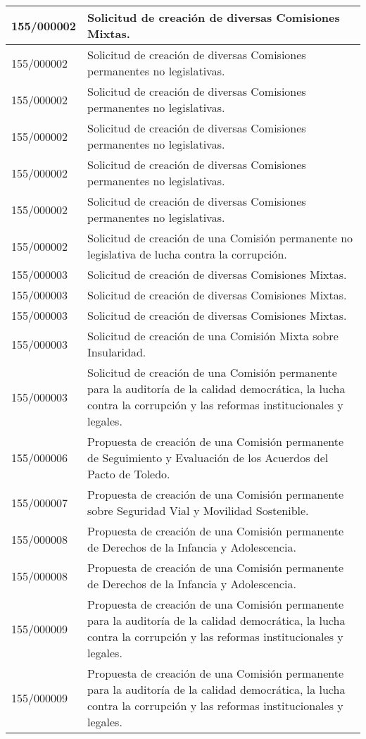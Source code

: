 {\begin{table}[H]
\begin{center}
\begin{tabularx}{\linewidth}{| l | X |}
\hline
155/000002 & Solicitud de creación de diversas Comisiones Mixtas. \\
\hline
155/000002 & Solicitud de creación de diversas Comisiones permanentes no legislativas. \\
\hline
155/000002 & Solicitud de creación de diversas Comisiones permanentes no legislativas. \\
\hline
155/000002 & Solicitud de creación de diversas Comisiones permanentes no legislativas. \\
\hline
155/000002 & Solicitud de creación de diversas Comisiones permanentes no legislativas. \\
\hline
155/000002 & Solicitud de creación de diversas Comisiones permanentes no legislativas. \\
\hline
155/000002 & Solicitud de creación de una Comisión permanente no legislativa de lucha contra la corrupción. \\
\hline
155/000003 & Solicitud de creación de diversas Comisiones Mixtas. \\
\hline
155/000003 & Solicitud de creación de diversas Comisiones Mixtas. \\
\hline
155/000003 & Solicitud de creación de diversas Comisiones Mixtas. \\
\hline
155/000003 & Solicitud de creación de una Comisión Mixta sobre Insularidad. \\
\hline
155/000003 & Solicitud de creación de una Comisión permanente para la auditoría de la calidad democrática, la lucha contra la corrupción y las reformas institucionales y legales. \\
\hline
155/000006 & Propuesta de creación de una Comisión permanente de Seguimiento y Evaluación de los Acuerdos del Pacto de Toledo. \\
\hline
155/000007 & Propuesta de creación de una Comisión permanente sobre Seguridad Vial y Movilidad Sostenible. \\
\hline
155/000008 & Propuesta de creación de una Comisión permanente de Derechos de la Infancia y Adolescencia. \\
\hline
155/000008 & Propuesta de creación de una Comisión permanente de Derechos de la Infancia y Adolescencia. \\
\hline
155/000009 & Propuesta de creación de una Comisión permanente para la auditoría de la calidad democrática, la lucha contra la corrupción y las reformas institucionales y legales. \\
\hline
155/000009 & Propuesta de creación de una Comisión permanente para la auditoría de la calidad democrática, la lucha contra la corrupción y las reformas institucionales y legales. \\

\end{tabularx}
\end{center}
\end{table}}
